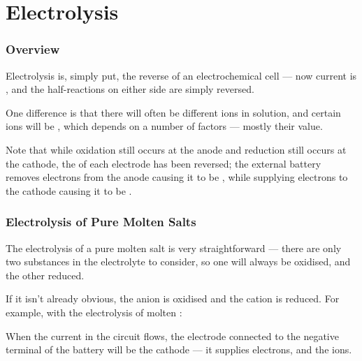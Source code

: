 

\pagebreak
\part{Electrolysis}

	\section{Overview}

		Electrolysis is, simply put, the reverse of an electrochemical cell --- now current is , and the half-reactions
		on either side are simply reversed.

		One difference is that there will often be different ions in solution, and certain ions will be , which
		depends on a number of factors --- mostly their \Eo{} value.

		Note that while oxidation still occurs at the anode and reduction still occurs at the cathode, the  of each
		electrode has been reversed; the external battery removes electrons from the anode causing it to be , while
		supplying electrons to the cathode causing it to be .


	\section{Electrolysis of Pure Molten Salts}

		The electrolysis of a pure molten salt is very straightforward --- there are only two substances in the electrolyte to consider, so one will
		always be oxidised, and the other reduced.

		If it isn't already obvious, the anion is oxidised and the cation is reduced. For example, with the electrolysis of molten :


		When the current in the circuit flows, the electrode connected to the negative terminal of the battery will be the cathode --- it supplies
		electrons, and  the  ions.

